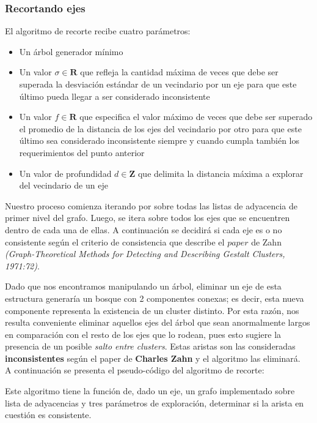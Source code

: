 \subsubsection{Recortando ejes}
El algoritmo de recorte recibe cuatro parámetros:
\begin{itemize}
	\item Un árbol generador mínimo 
	\item Un valor $\sigma \in \mathbf{R}$ que refleja la cantidad máxima de veces que debe ser superada la desviación estándar de un vecindario por un eje para que este último pueda llegar a ser considerado inconsistente
	\item Un valor $f \in \mathbf{R}$ que especifica el valor máximo de veces que debe ser superado el promedio de la distancia de los ejes del vecindario por otro para que este último sea considerado inconsistente siempre y cuando cumpla también los requerimientos del punto anterior
	\item Un valor de profundidad $d \in \mathbf{Z}$ que delimita la distancia máxima a explorar del vecindario de un eje
\end{itemize}

Nuestro proceso comienza iterando por sobre todas las listas de adyacencia de primer nivel del grafo. Luego, se itera sobre todos los ejes que se encuentren dentro de cada una de ellas. A continuación se decidirá si cada eje es o no consistente según el criterio de consistencia que describe el $paper$ de Zahn \textit{(Graph-Theoretical Methods for Detecting
and Describing Gestalt Clusters, 1971:72)}. 

\vskip 8pt

Dado que nos encontramos manipulando un árbol, eliminar un eje de esta estructura generaría un bosque con 2 componentes conexas; es decir, esta nueva componente representa la existencia de un cluster distinto. Por esta razón, nos resulta conveniente eliminar aquellos ejes del árbol que sean anormalmente largos en comparación con el resto de los ejes que lo rodean, pues esto sugiere la presencia de un posible \textit{salto entre clusters}. Estas aristas son las consideradas \textbf{inconsistentes} según el paper de \textbf{Charles Zahn} y el algoritmo las eliminará. \\
A continuación se presenta el pseudo-código del algoritmo de recorte:



Este algoritmo tiene la función de, dado un eje, un grafo implementado sobre lista de adyacencias y tres parámetros de exploración, determinar si la arista en cuestión es consistente.

